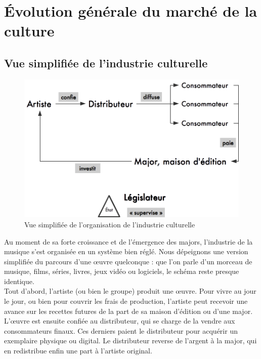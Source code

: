 \documentclass[a4paper]{report}
\begin{document}




	\chapter{Évolution générale du marché de la culture}
	
	\section{Vue simplifiée de l'industrie culturelle}

	\begin{figure}[ht]
		\includegraphics[width=13cm]{images/organisation-industrie-culturelle.png}
		\caption{Vue simplifiée de l'organisation de l'industrie culturelle}
	\end{figure}

	Au moment de sa forte croissance et de l'émergence des majors, l'industrie de la musique s'est organisée en un système bien réglé. Nous dépeignons une version simplifiée du parcours d'une œuvre quelconque : que l'on parle d'un morceau de musique, films, séries, livres, jeux vidéo ou logiciels, le schéma reste presque identique.\\

	Tout d'abord, l'artiste (ou bien le groupe) produit une œuvre. Pour vivre au jour le jour, ou bien pour couvrir les frais de production, l'artiste peut recevoir une avance sur les recettes futures de la part de sa maison d'édition ou d'une major. L'œuvre est ensuite confiée au distributeur, qui se charge de la vendre aux consommateurs finaux. Ces derniers paient le distributeur pour acquérir un exemplaire physique ou digital. Le distributeur reverse de l'argent à la major, qui en redistribue enfin une part à l'artiste original.\\
\end{document}
